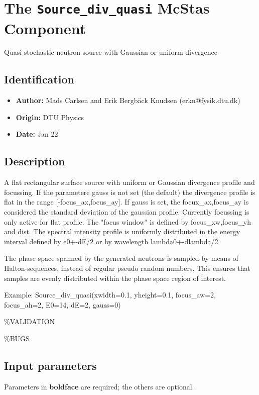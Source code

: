 \section{The \texttt{Source\_div\_quasi} McStas Component}
Quasi-stochastic neutron source with Gaussian or uniform divergence

\subsection*{Identification}
\begin{itemize}
  \item \textbf{Author:} Mads Carlsen and Erik Bergbäck Knudsen (erkn@fysik.dtu.dk)
  \item \textbf{Origin:} DTU Physics
  \item \textbf{Date:} Jan 22
\end{itemize}

\subsection*{Description}
A flat rectangular surface source with uniform or Gaussian divergence profile and focussing. If the parametere gauss is not set (the default) the divergence profile is flat in the range [-focus\_ax,focus\_ay]. If gauss is set, the focux\_ax,focus\_ay is considered the standard deviation of the gaussian profile. Currently focussing is only active for flat profile. The "focus window" is defined by focus\_xw,focus\_yh and dist. The spectral intensity profile is uniformly distributed in the energy interval defined by e0+-dE/2 or by wavelength lambda0+-dlambda/2

The phase space spanned by the generated neutrons is sampled by means of Halton-sequences, instead of regular pseudo random numbers. This ensures that samples are evenly distributed within the phase space region of interest.

Example: Source\_div\_quasi(xwidth=0.1, yheight=0.1, focus\_aw=2, focus\_ah=2, E0=14, dE=2, gauss=0)

\%VALIDATION

\%BUGS

\subsection*{Input parameters}
Parameters in \textbf{boldface} are required; the others are optional.

